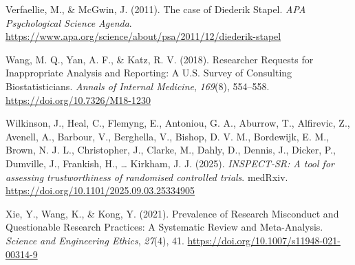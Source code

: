 \documentclass[
  nonatbib,
  authoryear,
  preprint]{elsarticle}
\newlength{\cslhangindent}
\newenvironment{CSLReferences}[2] %
 {\begin{list}{}{%
  \setlength{\itemindent}{0pt}
  \setlength{\leftmargin}{0pt}
  \setlength{\parsep}{0pt}
  \ifodd #1
   \setlength{\leftmargin}{\cslhangindent}
   \setlength{\itemindent}{-1\cslhangindent}
  \fi
  \setlength{\itemsep}{#2\baselineskip}}}
 {\end{list}}
\begin{document}
\begin{CSLReferences}{1}{0}
Verfaellie, M., \& McGwin, J. (2011). The case of {Diederik} {Stapel}.
\emph{APA Psychological Science Agenda}.
\url{https://www.apa.org/science/about/psa/2011/12/diederik-stapel}

Wang, M. Q., Yan, A. F., \& Katz, R. V. (2018). Researcher {Requests}
for {Inappropriate} {Analysis} and {Reporting}: {A} {U}.{S}. {Survey} of
{Consulting} {Biostatisticians}. \emph{Annals of Internal Medicine},
\emph{169}(8), 554--558. \url{https://doi.org/10.7326/M18-1230}

Wilkinson, J., Heal, C., Flemyng, E., Antoniou, G. A., Aburrow, T.,
Alfirevic, Z., Avenell, A., Barbour, V., Berghella, V., Bishop, D. V.
M., Bordewijk, E. M., Brown, N. J. L., Christopher, J., Clarke, M.,
Dahly, D., Dennis, J., Dicker, P., Dumville, J., Frankish, H., \ldots{}
Kirkham, J. J. (2025). \emph{{INSPECT}-{SR}: A tool for assessing
trustworthiness of randomised controlled trials}. medRxiv.
\url{https://doi.org/10.1101/2025.09.03.25334905}

Xie, Y., Wang, K., \& Kong, Y. (2021). Prevalence of {Research}
{Misconduct} and {Questionable} {Research} {Practices}: {A} {Systematic}
{Review} and {Meta}-{Analysis}. \emph{Science and Engineering Ethics},
\emph{27}(4), 41. \url{https://doi.org/10.1007/s11948-021-00314-9}

\end{CSLReferences}
\end{document}
